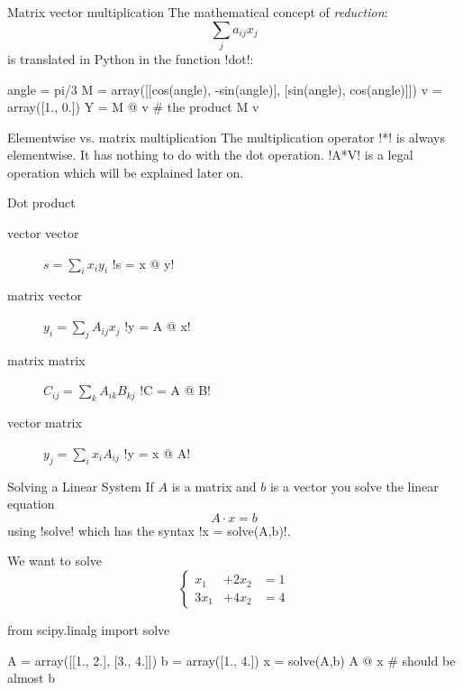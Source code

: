 \documentclass[hyperref={pdfpagelabels=false},table]{beamer}
\begin{document}
\begin{frame}[fragile]{Matrix vector multiplication}
The mathematical concept of \emph{reduction}:
\[ \sum_{j} a_{ij} x_{j}\]
is translated in Python in the function \pyth!dot!:
\begin{python}
angle = pi/3
M = array([[cos(angle), -sin(angle)],
           [sin(angle), cos(angle)]])
v = array([1., 0.])
Y = M @ v # the product M v
\end{python}
\begin{alertblock}{Elementwise vs. matrix multiplication}
The multiplication operator \pyth!*! is \alert{always} elementwise. It has nothing to do with the dot operation. \pyth!A*V! is a legal operation which will be explained later on.
\end{alertblock}
\end{frame}

\begin{frame}[fragile]{Dot product}
\begin{description}
\item[vector vector]  \hfill $s = \sum_ix_i y_i$ \hfill \pyth!s = x @ y!
\vfill
\item[matrix vector ]\hfill $ y_i =\sum_j A_{ij}x_j$ \hfill \pyth!y = A @ x!
 \vfill
\item[matrix matrix] \hfill $C_{ij} =\sum_{k} A_{ik}B_{kj} $ \hfill \pyth!C = A @ B!
 \vfill
\item[vector matrix] \hfill $y_j =\sum_i  x_i A_{ij}$ \hfill \pyth!y = x @ A!
\vfill
\end{description}
\end{frame}
\begin{frame}[fragile]{Solving a Linear System}
If $A$ is a matrix and $b$ is a vector you solve the linear equation
\[ A\cdot x = b\]
using \pyth!solve! which has the syntax \pyth!x = solve(A,b)!.

\begin{example}
We want to solve
\[\left\{\begin{aligned}x_1 &+ 2x_2 &= 1 \\ 3x_1 &+ 4x_2 &= 4\end{aligned}\right.\]
\begin{python}
from scipy.linalg import solve

A = array([[1., 2.],
           [3., 4.]])
b = array([1., 4.])
x = solve(A,b)
A @ x  # should be almost b
\end{python}
\end{example}
\end{frame}
\end{document}
